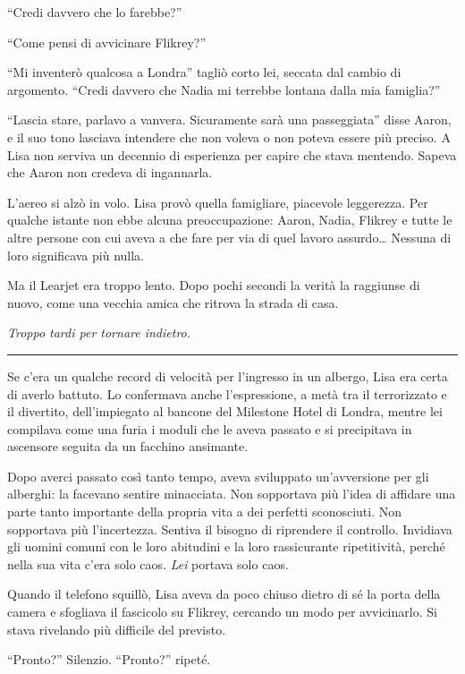 ``Credi davvero che lo farebbe?''

``Come pensi di avvicinare Flikrey?''

``Mi inventerò qualcosa a Londra'' tagliò corto lei, seccata dal cambio di argomento. ``Credi
davvero che Nadia mi terrebbe lontana dalla mia famiglia?''

``Lascia stare, parlavo a vanvera. Sicuramente sarà una passeggiata'' disse Aaron, e il suo tono
lasciava intendere che non voleva o non poteva essere più preciso. A Lisa non serviva un decennio di
esperienza per capire che stava mentendo. Sapeva che Aaron non credeva di ingannarla.

L'aereo si alzò in volo. Lisa provò quella famigliare, piacevole leggerezza. Per qualche istante non
ebbe alcuna preoccupazione: Aaron, Nadia, Flikrey e tutte le altre persone con cui aveva a che fare
per via di quel lavoro assurdo\dots{} Nessuna di loro significava più nulla.

Ma il Learjet era troppo lento. Dopo pochi secondi la verità la raggiunse di nuovo, come una vecchia
amica che ritrova la strada di casa.

\emph{Troppo tardi per tornare indietro.}

\plainbreak{1}

Se c'era un qualche record di velocità per l'ingresso in un albergo, Lisa era certa di averlo
battuto. Lo confermava anche l'espressione, a metà tra il terrorizzato e il divertito,
dell'impiegato al bancone del Milestone Hotel di Londra, mentre lei compilava come una furia i
moduli che le aveva passato e si precipitava in ascensore seguita da un facchino ansimante.

Dopo averci passato così tanto tempo, aveva sviluppato un'avversione per gli alberghi: la facevano
sentire minacciata. Non sopportava più l'idea di affidare una parte tanto importante della propria
vita a dei perfetti sconosciuti. Non sopportava più l'incertezza. Sentiva il bisogno di riprendere
il controllo. Invidiava gli uomini comuni con le loro abitudini e la loro rassicurante ripetitività,
perché nella sua vita c'era solo caos. \emph{Lei} portava solo caos.


Quando il telefono squillò, Lisa aveva da poco chiuso dietro di sé la porta della camera e sfogliava
il fascicolo su Flikrey, cercando un modo per avvicinarlo. Si stava rivelando più difficile del
previsto.

``Pronto?'' Silenzio. ``Pronto?'' ripeté.

